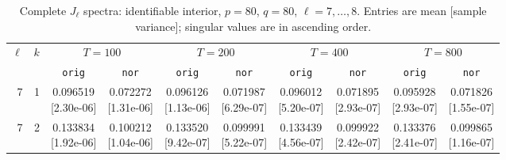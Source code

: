 \documentclass[12pt,letterpaper]{article}
\def\spacingset#1{\renewcommand{\baselinestretch}{#1}\small\normalsize}
\theoremstyle{plain}
\theoremstyle{definition}
\begin{document}
\clearpage
\begin{table}[p]
\begingroup
\spacingset{1.0}
\small\centering
\caption{Complete $J_\ell$ spectra: identifiable interior, $p=80$, $q=80$, $\ell=7,\ldots,8$. Entries are mean [sample variance]; singular values are in ascending order.}
\label{s23:lambda:alltab:spectra:p80q80interior:7-8}
\footnotesize
\setlength{\tabcolsep}{2.2pt}
\renewcommand{\arraystretch}{1.03}
\begin{adjustbox}{max width=\linewidth}
\begin{tabular}{@{}rr*{8}{c}@{}}
\toprule
$\ell$ & $k$ & \multicolumn{2}{c}{$T=100$} & \multicolumn{2}{c}{$T=200$} & \multicolumn{2}{c}{$T=400$} & \multicolumn{2}{c}{$T=800$}\\
\cmidrule(lr){3-4}\cmidrule(lr){5-6}\cmidrule(lr){7-8}\cmidrule(lr){9-10}
 &  & \texttt{orig} & \texttt{nor} & \texttt{orig} & \texttt{nor} & \texttt{orig} & \texttt{nor} & \texttt{orig} & \texttt{nor}\\
\midrule
7 & 1 & \shortstack{0.096519\\[-1pt]{\scriptsize[2.30e-06]}} & \shortstack{0.072272\\[-1pt]{\scriptsize[1.31e-06]}} & \shortstack{0.096126\\[-1pt]{\scriptsize[1.13e-06]}} & \shortstack{0.071987\\[-1pt]{\scriptsize[6.29e-07]}} & \shortstack{0.096012\\[-1pt]{\scriptsize[5.20e-07]}} & \shortstack{0.071895\\[-1pt]{\scriptsize[2.93e-07]}} & \shortstack{0.095928\\[-1pt]{\scriptsize[2.93e-07]}} & \shortstack{0.071826\\[-1pt]{\scriptsize[1.55e-07]}}\\
7 & 2 & \shortstack{0.133834\\[-1pt]{\scriptsize[1.92e-06]}} & \shortstack{0.100212\\[-1pt]{\scriptsize[1.04e-06]}} & \shortstack{0.133520\\[-1pt]{\scriptsize[9.42e-07]}} & \shortstack{0.099991\\[-1pt]{\scriptsize[5.22e-07]}} & \shortstack{0.133439\\[-1pt]{\scriptsize[4.56e-07]}} & \shortstack{0.099922\\[-1pt]{\scriptsize[2.42e-07]}} & \shortstack{0.133376\\[-1pt]{\scriptsize[2.41e-07]}} & \shortstack{0.099865\\[-1pt]{\scriptsize[1.16e-07]}}\\

\end{tabular}
\end{adjustbox}
\end{table}
\end{document}
